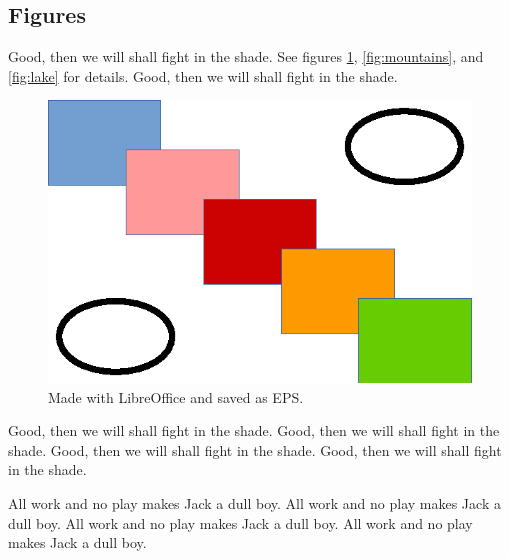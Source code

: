 
%
%

%
%

\subsection{Figures}
\label{sec:discussion_figures}

Good, then we will shall fight in the shade.
See figures
\ref{fig:shapes},
\ref{fig:mountains}, and
\ref{fig:lake} for details.
Good, then we will shall fight in the shade.

\begin{figure}[h]
\centering
\includegraphics{../figures/shapes.eps}
\caption{Made with LibreOffice and saved as EPS.}
\label{fig:shapes}
\end{figure}

Good, then we will shall fight in the shade.
Good, then we will shall fight in the shade.
Good, then we will shall fight in the shade.
Good, then we will shall fight in the shade.

All work and no play makes Jack a dull boy.
All work and no play makes Jack a dull boy.
All work and no play makes Jack a dull boy.
All work and no play makes Jack a dull boy.

